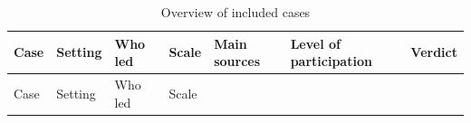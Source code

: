 \documentclass[
  number,
  preprint]{elsarticle}
\begin{document}
\begin{landscape}

\begin{longtable}[]{@{}
  >{\raggedright\arraybackslash}p{}
  >{\raggedright\arraybackslash}p{}
  >{\raggedright\arraybackslash}p{}
  >{\raggedright\arraybackslash}p{}
  >{\raggedright\arraybackslash}p{}
  >{\raggedright\arraybackslash}p{}
  >{\raggedright\arraybackslash}p{}@{}}
\caption[]{Overview of included
cases}\label{tbl-case-overview}\tabularnewline
\toprule\noalign{}
\begin{minipage}[b]{\linewidth}\raggedright
Case
\end{minipage} & \begin{minipage}[b]{\linewidth}\raggedright
Setting
\end{minipage} & \begin{minipage}[b]{\linewidth}\raggedright
Who led
\end{minipage} & \begin{minipage}[b]{\linewidth}\raggedright
Scale
\end{minipage} & \begin{minipage}[b]{\linewidth}\raggedright
Main sources
\end{minipage} & \begin{minipage}[b]{\linewidth}\raggedright
Level of participation
\end{minipage} & \begin{minipage}[b]{\linewidth}\raggedright
Verdict
\end{minipage} \\
\midrule\noalign{}
\endfirsthead
\toprule\noalign{}
\begin{minipage}[b]{\linewidth}\raggedright
Case
\end{minipage} & \begin{minipage}[b]{\linewidth}\raggedright
Setting
\end{minipage} & \begin{minipage}[b]{\linewidth}\raggedright
Who led
\end{minipage} & \begin{minipage}[b]{\linewidth}\raggedright
Scale
\end{minipage} & \begin{minipage}[b]{\linewidth}\raggedright

\end{minipage}
\end{longtable}
\end{landscape}
\end{document}
